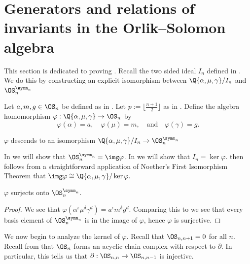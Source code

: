 \documentclass{amsart}
\begin{document}
\section{Generators and relations of invariants in the Orlik--Solomon algebra}\label{sec:RingStructure}

This section is dedicated to proving .
Recall the two sided ideal $I_n$ defined in .
We do this by constructing an explicit isomorphism between $\Q\{\alpha, \mu, \gamma \}/I_n$ and $\OS_n^{\symm_n}$

\begin{definition}\label{def:IsomorphismMap}
    Let $a,m,g \in \OS_n$ be defined as in .
    Let $p := \lfloor \frac{n+1}{2}\rfloor$ as in .
    Define the algebra homomorphism $\varphi: \Q\{\alpha,\mu,\gamma \} \to \OS_n$ by
    \[\varphi(\alpha) = a, \quad \varphi(\mu) = m, \quad \text{and} \quad \varphi(\gamma) = g.\]
\end{definition}

\begin{proposition}\label{prop:ExplicitIsomOS}
    $\varphi$ descends to an isomorphism $\Q\{\alpha,\mu,\gamma \}/I_n \to \OS_n^{\symm_n}$
\end{proposition}
In  we will show that $\OS_n^{\symm_n} = \img \varphi$.
In  we will show that $I_n = \ker \varphi$.
 then follows from a straightforward application of Noether's First Isomorphism Theorem that $\img \varphi \cong \Q\{\alpha, \mu, \gamma\}/\ker \varphi.$


\begin{lemma}\label{lemma:ImVarPhi}
    $\varphi$ surjects onto $\OS_n^{\symm_n}$.
\end{lemma}

\begin{proof}
    We see that $\varphi(\alpha^\epsilon \mu^\delta \gamma^d) = a^\epsilon m^\delta g^d$.
    Comparing this to  we see that every basis element of $\OS_n^{\symm_n}$ is in the image of $\varphi$, hence $\varphi$ is surjective.
\end{proof}

We now begin to analyze the kernel of $\varphi$.
Recall that $\OS_{n,n+1} = 0$ for all $n$.
Recall from  that $\OS_n$ forms an acyclic chain complex with respect to $\partial$.
In particular, this tells us that 
$\partial: \OS_{n,n} \to \OS_{n,n-1}$ is injective.
\end{document}
